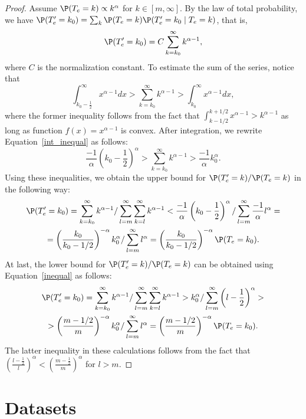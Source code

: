 \documentclass{article}
\begin{document}
\begin{proof}
Assume $\P(T_e=k)\propto k^{\alpha}$ for $k\in [m,\infty]$. By the law of total probability, we have $\P(T'_e=k_0)= \sum_{k}\P(T_e=k)\P(T'_e=k_0\mid T_e=k)$, that is,
$$
\P(T'_e=k_0) = C \sum_{k=k_0}^{\infty} k^{\alpha-1},
$$
where $C$ is the normalization constant. To estimate the sum of the series, notice that
\begin{equation}\label{int_inequal}
\int_{k_0-\frac{1}{2}}^\infty x^{\alpha-1} dx > \sum_{k=k_0}^{\infty} k^{\alpha-1} > \int_{k_0}^\infty x^{\alpha-1} dx,    
\end{equation}
where the former inequality follows from the fact that $\int_{k-1/2}^{k+1/2} x^{\alpha-1}> k^{\alpha-1}$ as long as function $f(x)=x^{\alpha-1}$ is convex. After integration, we rewrite Equation~\ref{int_inequal} as follows:
\begin{equation}\label{inequal}
\frac{-1}{\alpha} \left ( k_0-\frac{1}{2}\right )^{\alpha} > \sum_{k=k_0}^{\infty} k^{\alpha-1} > \frac{-1}{\alpha} k_0^{\alpha}. \end{equation}
Using these inequalities, we obtain the upper bound for $\P(T'_e=k)/\P(T_e=k)$ in the following way:
\begin{multline*}
\P(T'_e=k_0) = \sum_{k=k_0}^{\infty} k^{\alpha-1} / \sum_{l=m}^\infty \sum_{k=l}^{\infty} k^{\alpha-1} < \frac{-1}{\alpha} \left ( k_0-\frac{1}{2}\right )^{\alpha} / \sum_{l=m}^\infty \frac{-1}{\alpha} l^{\alpha} = \\
=\left (\frac{k_0}{k_0-1/2}\right )^{-\alpha} k_0^\alpha/\sum_{l=m}^\infty l^{\alpha} = \left (\frac{k_0}{k_0-1/2}\right )^{-\alpha} \P(T_e=k_0).
\end{multline*}
At last, the lower bound for $\P(T'_e=k)/\P(T_e=k)$ can be obtained using Equation~\ref{inequal} as follows:
\begin{multline*}
\P(T'_e=k_0) = \sum_{k=k_0}^{\infty} k^{\alpha-1} / \sum_{l=m}^\infty \sum_{k=l}^{\infty} k^{\alpha-1} > k_0^{\alpha} / \sum_{l=m}^\infty  \left (l-\frac{1}{2}\right )^{\alpha} > \\
> \left (\frac{m-1/2}{m}\right )^{-\alpha} k_0^\alpha/\sum_{l=m}^\infty l^{\alpha} = \left (\frac{m-1/2}{m}\right )^{-\alpha} \P(T_e=k_0).
\end{multline*}
The latter inequality in these calculations follows from the fact that $\left (\frac{l-\frac{1}{2}}{l}\right )^{\alpha}<\left (\frac{m-\frac{1}{2}}{m}\right )^{\alpha}$ for $l>m$.

\end{proof}

\section{Datasets} \label{app-sec-datasets}
\end{document}
